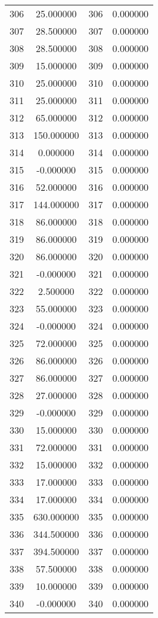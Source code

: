 \documentclass[12pt]{article}
\begin{document}
\begin{longtable}{@{}cccc@{}}
306 & 25.000000 & 306 & 0.000000 \\
307 & 28.500000 & 307 & 0.000000 \\
308 & 28.500000 & 308 & 0.000000 \\
309 & 15.000000 & 309 & 0.000000 \\
310 & 25.000000 & 310 & 0.000000 \\
311 & 25.000000 & 311 & 0.000000 \\
312 & 65.000000 & 312 & 0.000000 \\
313 & 150.000000 & 313 & 0.000000 \\
314 & 0.000000 & 314 & 0.000000 \\
315 & -0.000000 & 315 & 0.000000 \\
316 & 52.000000 & 316 & 0.000000 \\
317 & 144.000000 & 317 & 0.000000 \\
318 & 86.000000 & 318 & 0.000000 \\
319 & 86.000000 & 319 & 0.000000 \\
320 & 86.000000 & 320 & 0.000000 \\
321 & -0.000000 & 321 & 0.000000 \\
322 & 2.500000 & 322 & 0.000000 \\
323 & 55.000000 & 323 & 0.000000 \\
324 & -0.000000 & 324 & 0.000000 \\
325 & 72.000000 & 325 & 0.000000 \\
326 & 86.000000 & 326 & 0.000000 \\
327 & 86.000000 & 327 & 0.000000 \\
328 & 27.000000 & 328 & 0.000000 \\
329 & -0.000000 & 329 & 0.000000 \\
330 & 15.000000 & 330 & 0.000000 \\
331 & 72.000000 & 331 & 0.000000 \\
332 & 15.000000 & 332 & 0.000000 \\
333 & 17.000000 & 333 & 0.000000 \\
334 & 17.000000 & 334 & 0.000000 \\
335 & 630.000000 & 335 & 0.000000 \\
336 & 344.500000 & 336 & 0.000000 \\
337 & 394.500000 & 337 & 0.000000 \\
338 & 57.500000 & 338 & 0.000000 \\
339 & 10.000000 & 339 & 0.000000 \\
340 & -0.000000 & 340 & 0.000000 \\

\end{longtable}
\end{document}
